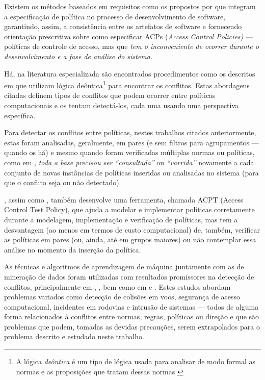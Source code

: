 Existem os métodos baseados em requisitos como os propostos por  que integram a especificação de política no processo de desenvolvimento de software, garantindo, assim, a consistência entre os artefatos de software e fornecendo orientação prescritiva sobre como especificar ACPs (\textit{Access Control Policies)} --- políticas de controle de acesso, mas que\textit{ tem o inconveniente de ocorrer durante o desenvolvimento e a fase de análise do sistema}.

Há, na literatura especializada são encontrados procedimentos como os descritos em  que utilizam lógica deôntica\footnote{A lógica \textit{deôntica} é um tipo de lógica usada para analisar de modo formal as normas e as proposições que tratam dessas normas \cite{eduardo2017}} para encontrar os conflitos. Estas abordagens citadas definem tipos de conflitos que podem ocorrer entre políticas computacionais e os tentam detectá-los, cada uma usando uma perspectiva específica. 

Para detectar os conflitos entre políticas, nestes trabalhos citados anteriormente, estas foram analisadas, geralmente, em pares (e sem filtros para agrupamentos --- quando os há) e mesmo quando foram verificadas múltiplas normas ou políticas, como em , \textit{toda a base precisou ser} \textit{``consultada''} ou \textit{``varrida''} novamente a cada conjunto de novas instâncias de políticas inseridas ou analisadas no sistema (para que o conflito seja ou não detectado).


, assim como , também desenvolve uma ferramenta, chamada ACPT (Access Control Test Policy), que ajuda a modelar e implementar políticas corretamente durante a modelagem, implementação e verificação de políticas, mas tem a desvantagem (ao menos em termos de custo computacional) de, também, verificar as políticas em pares (ou, ainda, até em grupos maiores) ou não contemplar essa análise no momento da inserção da política.

As técnicas e algoritmos de aprendizagem de máquina juntamente com as de mineração de dados foram utilizadas com resultados promissores na detecção de conflitos, principalmente em , , bem como em  e . Estes estudos abordam problemas variados como detecção de colisões em voos, segurança de acesso computacional, incidentes em rodovias e intrusão de sistemas — todos de alguma forma relacionados à conflitos entre normas, regras, políticas ou direção e que são problemas que podem, tomadas as devidas precauções, serem extrapolados para o problema descrito e estudado neste trabalho.

